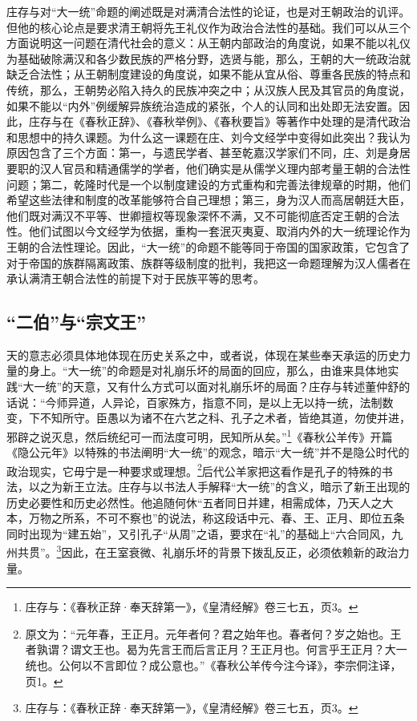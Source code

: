 \documentclass[a4paper, 12pt, openright]{ctexbook}
\begin{document}
庄存与对“大一统”命题的阐述既是对满清合法性的论证，也是对王朝政治的讥评。但他的核心论点是要求清王朝将先王礼仪作为政治合法性的基础。我们可以从三个方面说明这一问题在清代社会的意义：从王朝内部政治的角度说，如果不能以礼仪为基础破除满汉和各少数民族的严格分野，选贤与能，那么，王朝的大一统政治就缺乏合法性；从王朝制度建设的角度说，如果不能从宜从俗、尊重各民族的特点和传统，那么，王朝势必陷入持久的民族冲突之中；从汉族人民及其官员的角度说，如果不能以“内外”例缓解异族统治造成的紧张，个人的认同和出处即无法安置。因此，庄存与在《春秋正辞》、《春秋举例》、《春秋要旨》等著作中处理的是清代政治和思想中的持久课题。为什么这一课题在庄、刘今文经学中变得如此突出？我认为原因包含了三个方面：第一，与遗民学者、甚至乾嘉汉学家们不同，庄、刘是身居要职的汉人官员和精通儒学的学者，他们确实是从儒学义理内部考量王朝的合法性问题；第二，乾隆时代是一个以制度建设的方式重构和完善法律规章的时期，他们希望这些法律和制度的改革能够符合自己理想；第三，身为汉人而高居朝廷大臣，他们既对满汉不平等、世卿擅权等现象深怀不满，又不可能彻底否定王朝的合法性。他们试图以今文经学为依据，重构一套泯灭夷夏、取消内外的大一统理论作为王朝的合法性理论。因此，“大一统”的命题不能等同于帝国的国家政策，它包含了对于帝国的族群隔离政策、族群等级制度的批判，我把这一命题理解为汉人儒者在承认满清王朝合法性的前提下对于民族平等的思考。

\subsection{“二伯”与“宗文王”}

天的意志必须具体地体现在历史关系之中，或者说，体现在某些奉天承运的历史力量的身上。“大一统”的命题是对礼崩乐坏的局面的回应，那么，由谁来具体地实践“大一统”的天意，又有什么方式可以面对礼崩乐坏的局面？庄存与转述董仲舒的话说：“今师异道，人异论，百家殊方，指意不同，是以上无以持一统，法制数变，下不知所守。臣愚以为诸不在六艺之科、孔子之术者，皆绝其道，勿使并进，邪辟之说灭息，然后统纪可一而法度可明，民知所从矣。”\footnote{庄存与：《春秋正辞·奉天辞第一》，《皇清经解》卷三七五，页3。}《春秋公羊传》开篇《隐公元年》以特殊的书法阐明“大一统”的观念，暗示“大一统”并不是隐公时代的政治现实，它毋宁是一种要求或理想。\footnote{原文为：“元年春，王正月。元年者何？君之始年也。春者何？岁之始也。王者孰谓？谓文王也。曷为先言王而后言正月？王正月也。何言乎王正月？大一统也。公何以不言即位？成公意也。”《春秋公羊传今注今译》，李宗侗注译，页1。}后代公羊家把这看作是孔子的特殊的书法，以之为新王立法。庄存与以书法人手解释“大一统”的含义，暗示了新王出现的历史必要性和历史必然性。他追随何休“五者同日并建，相需成体，乃天人之大本，万物之所系，不可不察也”的说法，称这段话中元、春、王、正月、即位五条同时出现为“建五始”，又引孔子“从周”之语，要求在“礼”的基础上“六合同风，九州共贯”。\footnote{庄存与：《春秋正辞·奉天辞第一》，《皇清经解》卷三七五，页3。}因此，在王室衰微、礼崩乐坏的背景下拨乱反正，必须依赖新的政治力量。
\end{document}
